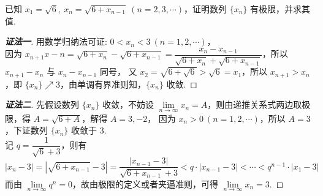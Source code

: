 \begin{example}
    已知 $x_1=\sqrt{6},~x_n=\sqrt{6+x_{n-1}}~  (n=2,3,\cdots)$，证明数列 $\{x_n\}$ 有极限，并求其值.
\end{example}
\begin{proof}[{\songti \textbf{证法一}}]
    用数学归纳法可证: $0<x_n<3~  (n=1,2,\cdots)$，\\
    因为 $x_{n+1}x-{n}=\sqrt{6+x_n}-\sqrt{6+x_{n-1}}=\dfrac{x_n-x_{n-1}}{\sqrt{6+x_n}+\sqrt{6+x_{n-1}}}$，所以 $x_{n+1}-x_n$ 与 $x_n-x_{n-1}$ 同号，
    又 $x_2=\sqrt{6+\sqrt{6}}>\sqrt{6}=x_1$，所以 $x_{n+1}>x_{n}$，即 $\{x_n\}\nearrow 3$，由单调有界准则知，$\{x_n\}$ 收敛.
\end{proof}
\begin{proof}[{\songti \textbf{证法二}}]
    先假设数列 $\{x_n\}$ 收敛，不妨设 $\lim\limits_{n\to\infty}x_n=A$，则由递推关系式两边取极限，得 $A=\sqrt{6+A}$，解得 $A=3,-2$，
    因为 $x_n>0~  (n=1,2,\cdots)$，所以 $A=3$，下证数列 $\{x_n\}$ 收敛于 $3$.\\
    记 $q=\dfrac{1}{\sqrt{6}+3}$，则有
    $$|x_n-3|=\left|\sqrt{6+x_{n-1}}-3\right|=\dfrac{|x_{n-1}-3|}{\sqrt{6+x_{n-1}}+3}<q\cdot|x_{n-1}-3|<\cdots<q^{n-1}\cdot|x_1-3|$$
    而由 $\lim\limits_{n\to\infty}q^n=0$，故由极限的定义或者夹逼准则，可得 $\lim\limits_{n\to\infty}x_n=3.$
\end{proof}

